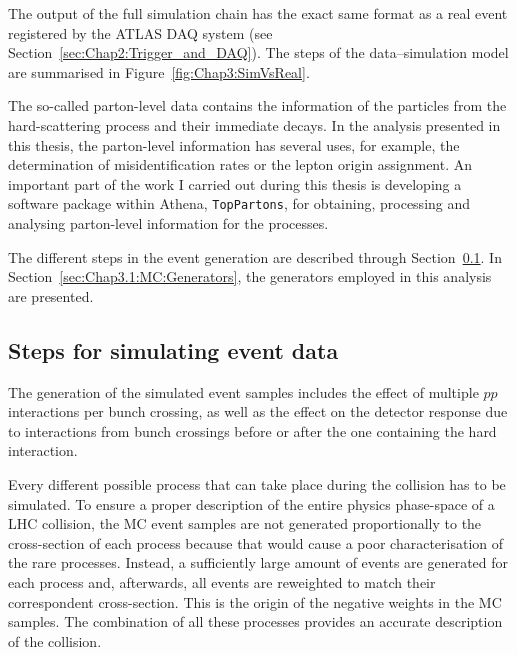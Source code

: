The output of the full simulation chain has the exact same format as a real event registered by 
 the ATLAS DAQ system (see Section~\ref{sec:Chap2:Trigger_and_DAQ}). The steps of the 
 data--simulation model are summarised in Figure~\ref{fig:Chap3:SimVsReal}. 

 
The so-called parton-level data contains the information of the particles
from the hard-scattering process and their immediate decays. 
In the analysis presented in this thesis, the parton-level information 
has several uses, for example, the determination of misidentification rates or the lepton 
origin assignment. An important part of the work I carried out during this
thesis is developing a software package within Athena, 
\texttt{TopPartons}, for obtaining, processing and analysing parton-level information for
the \tHq processes. %



The different steps in the event generation are described through Section~\ref{sec:Chap3.1:MC:Steps}.
In Section~\ref{sec:Chap3.1:MC:Generators}, the generators employed in this
analysis are presented.


\subsection{Steps for simulating event data}
\label{sec:Chap3.1:MC:Steps}
The generation of the simulated event samples includes the effect of multiple \(pp\) interactions per 
bunch crossing, as well as the effect on the detector response due to interactions from bunch crossings 
before or after the one containing the hard interaction. 

Every different possible process that can take place
during the collision has to be simulated. To ensure a proper description 
of the entire physics phase-space of a LHC collision, the MC event samples are not generated proportionally 
to the cross-section of each process because that would cause a poor
characterisation of the rare processes. Instead, a sufficiently large amount of
events are generated for each process and, afterwards, all events
are reweighted to match their correspondent cross-section. This is the
origin of the negative weights in the MC samples. 
The combination of all these 
processes provides an accurate description of the collision. 

